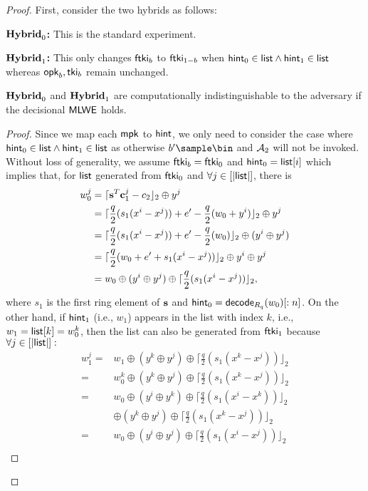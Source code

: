 \begin{proof}
First, consider the two hybrids as follows:

\noindent\textbf{$\mathbf{Hybrid}_0$:} This is the standard experiment.

\noindent\textbf{$\mathbf{Hybrid}_1$:} This only changes $\mathsf{ftki}_b$ to $\mathsf{ftki}_{1-b}$ when $\mathsf{hint}_0\in\mathsf{list}\wedge\mathsf{hint}_1\in\mathsf{list}$ whereas $\mathsf{opk}_b,\mathsf{tki}_b$ remain unchanged.
\begin{claim}
\label{clm: unlink}
$\mathbf{Hybrid}_0$ and $\mathbf{Hybrid}_1$ are computationally indistinguishable to the adversary if the decisional $\mathsf{MLWE}$ holds.
\end{claim}
\begin{proof}
Since we map each $\mathsf{mpk}$ to $\mathsf{hint}$, we only need to consider the case where $\mathsf{hint}_0\in\mathsf{list}\wedge\mathsf{hint}_1\in\mathsf{list}$ as otherwise $b'\sample\bin$ and $\mathcal{A}_2$ will not be invoked. 
Without loss of generality, we assume $\mathsf{ftki}_b=\mathsf{ftki}_0$ and $\mathsf{hint}_0=\mathsf{list}[i]$ which implies that, for $\mathsf{list}$ generated from $\mathsf{ftki}_0$ and $\forall j\in[|\mathsf{list}|]$, there is
\begin{align*}
    w_0^j ={}&\lceil \mathbf{s}^T\mathbf{c}_1^j-c_2\rfloor_2\oplus y^j\\
          ={}&\lceil \frac{q}{2}(s_1(x^i-x^j)) + e'-\frac{q}{2}(w_0+y^i)\rfloor_2\oplus y^j\\
          ={}&\lceil \frac{q}{2}(s_1(x^i-x^j)) + e'-\frac{q}{2}(w_0)\rfloor_2\oplus (y^i\oplus y^j)\\
          ={}&\lceil \frac{q}{2}(w_0+e'+s_1(x^i-x^j))\rfloor_2 \oplus y^i\oplus y^j\\
          ={}&w_0\oplus(y^i\oplus y^j)\oplus\lceil\frac{q}{2}(s_1(x^i-x^j))\rfloor_2,
\end{align*}
where $s_1$ is the first ring element of $\mathbf{s}$ and $\mathsf{hint}_0=\mathsf{decode}_{R_q}(w_0)[:n]$.
On the other hand, if $\mathsf{hint}_1$ (i.e., $w_1$) appears in the list with index $k$, i.e., $w_1=\mathsf{list}[k]=w_0^k$, then the list can also be generated from $\mathsf{ftki}_1$ because $\forall j\in[|\mathsf{list}|]:$
\begin{align*}
    w_1^j ={}& w_1 \oplus (y^k\oplus y^j)\oplus\lceil\frac{q}{2}(s_1(x^k-x^j))\rfloor_2\\
    = {}& w_0^k \oplus (y^k\oplus y^j)\oplus\lceil\frac{q}{2}(s_1(x^k-x^j))\rfloor_2\\
    = {}&w_0\oplus(y^i\oplus y^k)\oplus\lceil\frac{q}{2}(s_1(x^i-x^k))\rfloor_2\\
    {}& \oplus (y^k\oplus y^j)\oplus\lceil\frac{q}{2}(s_1(x^k-x^j))\rfloor_2\\
    = {}&w_0\oplus(y^i\oplus y^j)\oplus\lceil\frac{q}{2}(s_1(x^i-x^j))\rfloor_2\\

\end{align*}
\end{proof}
\end{proof}
